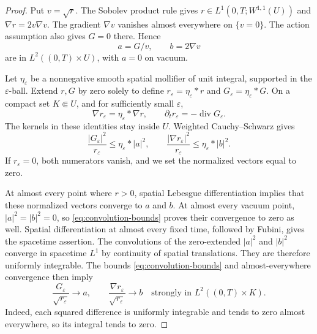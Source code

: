 \documentclass[11pt]{article}
\newcommand{\grad}{\nabla}
\newcommand{\Div}{\operatorname{div}}
\begin{document}
\begin{proof}
Put $v=\sqrt r$. The Sobolev product rule gives
$r\in L^1(0,T;W^{1,1}(U))$ and $\grad r=2v\grad v$.
The gradient $\grad v$ vanishes almost everywhere on $\{v=0\}$.
The action assumption also gives $G=0$ there. Hence
\[
 a=G/v,\qquad b=2\grad v
\]
are in $L^2((0,T)\times U)$, with $a=0$ on vacuum.

Let $\eta_\varepsilon$ be a nonnegative smooth spatial mollifier of unit
integral, supported in the $\varepsilon$-ball. Extend $r,G$ by zero solely
to define $r_\varepsilon=\eta_\varepsilon*r$ and
$G_\varepsilon=\eta_\varepsilon*G$.
On a compact set $K\Subset U$, and for sufficiently small $\varepsilon$,
\[
 \grad r_\varepsilon=\eta_\varepsilon*\grad r,
 \qquad \partial_t r_\varepsilon=-\Div G_\varepsilon.
\]
The kernels in these identities stay inside $U$.
Weighted Cauchy--Schwarz gives
\begin{equation}\label{eq:convolution-bounds}
 \frac{|G_\varepsilon|^2}{r_\varepsilon}
   \leq\eta_\varepsilon*|a|^2,
 \qquad
 \frac{|\grad r_\varepsilon|^2}{r_\varepsilon}
   \leq\eta_\varepsilon*|b|^2.
\end{equation}
If $r_\varepsilon=0$, both numerators vanish, and we set the normalized
vectors equal to zero.

At almost every point where $r>0$, spatial Lebesgue differentiation implies
that these normalized vectors converge to $a$ and $b$. At almost every
vacuum point, $|a|^2=|b|^2=0$, so \eqref{eq:convolution-bounds} proves their
convergence to zero as well. Spatial differentiation at almost every fixed
time, followed by Fubini, gives the spacetime assertion. The convolutions of
the zero-extended $|a|^2$ and $|b|^2$ converge in spacetime $L^1$ by
continuity of spatial translations. They are therefore uniformly integrable.
The bounds \eqref{eq:convolution-bounds} and almost-everywhere convergence
then imply
\begin{equation}\label{eq:normalized-convergence}
 \frac{G_\varepsilon}{\sqrt{r_\varepsilon}}\longrightarrow a,
 \qquad
 \frac{\grad r_\varepsilon}{\sqrt{r_\varepsilon}}\longrightarrow b
 \quad\text{strongly in }L^2((0,T)\times K).
\end{equation}
Indeed, each squared difference is uniformly integrable and tends to zero
almost everywhere, so its integral tends to zero.


\end{proof}
\end{document}
